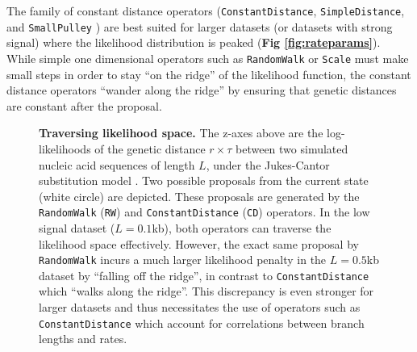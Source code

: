 \documentclass[10pt,letterpaper]{article}
\begin{document}
The family of constant distance operators (\texttt{ConstantDistance}, \texttt{SimpleDistance}, and \texttt{SmallPulley} \cite{zhang2020improving}) are best suited for larger datasets (or datasets with strong signal) where the likelihood distribution is peaked (\textbf{Fig \ref{fig:rateparams}}).
While simple one dimensional operators such as \texttt{RandomWalk} or \texttt{Scale} must make small steps in order to stay ``on the ridge'' of the likelihood function, the constant distance operators ``wander along the ridge''  by ensuring that genetic distances are constant after the proposal.



\begin{figure}[!h]
\caption{\textbf{Traversing likelihood space.}
The z-axes above are the log-likelihoods of the genetic distance $r \times \tau$ between two simulated nucleic acid sequences of length $L$, under the Jukes-Cantor substitution model \cite{jukes1969evolution}. 
Two possible proposals from the current state (white circle) are depicted.
These proposals are generated by the \texttt{RandomWalk} (\texttt{RW}) and \texttt{ConstantDistance} (\texttt{CD}) operators.
In the low signal dataset ($L=0.1$kb), both operators can traverse the likelihood space effectively.
 However, the exact same proposal by \texttt{RandomWalk} incurs a much larger likelihood penalty in the $L=0.5$kb dataset by ``falling off the ridge'', in contrast to \texttt{ConstantDistance} which ``walks along the ridge''.
 This discrepancy is even stronger for larger datasets and thus necessitates the use of operators such as \texttt{ConstantDistance} which account for correlations between branch lengths and rates. }
\label{fig:landscape}
\end{figure}
\end{document}
